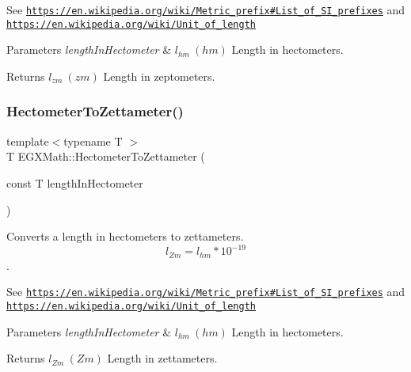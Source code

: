 See \href{https://en.wikipedia.org/wiki/Metric_prefix#List_of_SI_prefixes}{\tt https\+://en.\+wikipedia.\+org/wiki/\+Metric\+\_\+prefix\#\+List\+\_\+of\+\_\+\+S\+I\+\_\+prefixes} and \href{https://en.wikipedia.org/wiki/Unit_of_length}{\tt https\+://en.\+wikipedia.\+org/wiki/\+Unit\+\_\+of\+\_\+length} 
\begin{DoxyParams}{Parameters}
{\em length\+In\+Hectometer} & $ l_{hm}\ (hm)$ Length in hectometers. \\
\hline
\end{DoxyParams}
\begin{DoxyReturn}{Returns}
$ l_{zm}\ (zm)$ Length in zeptometers. 
\end{DoxyReturn}
\mbox{\label{group___e_g_x_math-_conversions-_length_conversions-_hectometer-_s_i_ga72ca6c210560d06577273cb2c1e44250}} 
\subsubsection{\texorpdfstring{Hectometer\+To\+Zettameter()}{HectometerToZettameter()}}
{\footnotesize\ttfamily template$<$typename T $>$ \\
T E\+G\+X\+Math\+::\+Hectometer\+To\+Zettameter (\begin{DoxyParamCaption}\item[{const T}]{length\+In\+Hectometer }\end{DoxyParamCaption})}



Converts a length in hectometers to zettameters. \[ l_{Zm}=l_{hm} * 10^{-19} \]. 

See \href{https://en.wikipedia.org/wiki/Metric_prefix#List_of_SI_prefixes}{\tt https\+://en.\+wikipedia.\+org/wiki/\+Metric\+\_\+prefix\#\+List\+\_\+of\+\_\+\+S\+I\+\_\+prefixes} and \href{https://en.wikipedia.org/wiki/Unit_of_length}{\tt https\+://en.\+wikipedia.\+org/wiki/\+Unit\+\_\+of\+\_\+length} 
\begin{DoxyParams}{Parameters}
{\em length\+In\+Hectometer} & $ l_{hm}\ (hm)$ Length in hectometers. \\
\hline
\end{DoxyParams}
\begin{DoxyReturn}{Returns}
$ l_{Zm}\ (Zm)$ Length in zettameters. 
\end{DoxyReturn}
